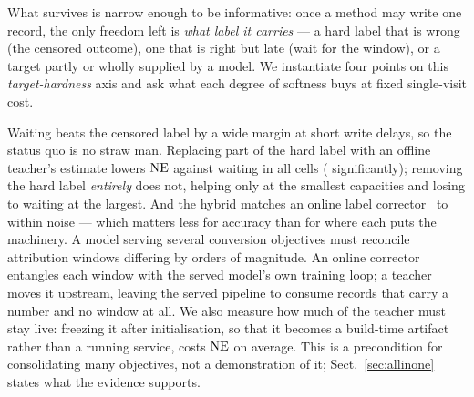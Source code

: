 What survives is narrow enough to be informative: once a method may write one record, the
only freedom left is \emph{what label it carries} --- a hard label that is wrong (the censored
outcome), one that is right but late (wait for the window), or a target partly or wholly
supplied by a model. We instantiate four points on this \emph{target-hardness} axis and ask
what each degree of softness buys at fixed single-visit cost.

Waiting beats the censored label by a wide margin at short write delays, so the status quo is no
straw man. Replacing part of the hard label with an offline teacher's estimate lowers $\mathrm{NE}$
against waiting in all \cdWaitN{} cells (\cdWaitSig{} significantly); removing the hard label
\emph{entirely} does not, helping only at the smallest capacities and losing to waiting at the
largest. And the hybrid matches an online label corrector~\cite{wang2023unbiased} to within noise ---
which matters less for accuracy than for where each puts the machinery. A model serving several
conversion objectives must reconcile attribution windows differing by orders of magnitude. An
online corrector entangles each window with the served model's own training loop; a teacher
moves it upstream, leaving the served pipeline to consume records that carry a number and no
window at all. We also measure how much of the teacher must stay live: freezing it after initialisation, so
that it becomes a build-time artifact rather than a running service, costs \frzMean{} $\mathrm{NE}$ on
average. This is a precondition for consolidating many objectives, not a demonstration of it;
Sect.~\ref{sec:allinone} states what the evidence supports.
